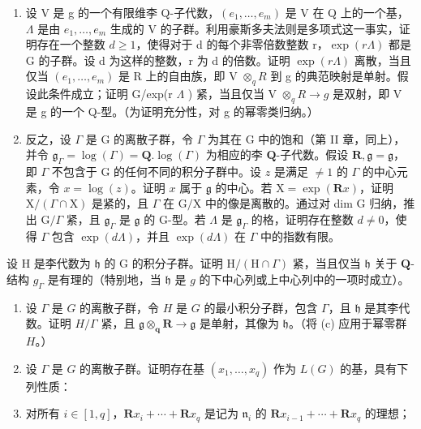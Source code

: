 \begin{enumerate}
\def\labelenumi{(\alph{enumi})}
\setcounter{enumi}{1}
\item
  设 V 是 g 的一个有限维李 Q-子代数，\((e_{1},\ldots,e_{m})\) 是 V 在 Q 上的一个基，\(\Lambda\) 是由 \(e_{1},\ldots,e_{m}\) 生成的 V 的子群。利用豪斯多夫法则是多项式这一事实，证明存在一个整数 \(d\geqslant1\)，使得对于 d 的每个非零倍数整数 r，\(\exp(r\Lambda)\) 都是 G 的子群。设 d 为这样的整数，r 为 d 的倍数。证明 \(\exp(r\Lambda)\) 离散，当且仅当 \((e_{1},\ldots,e_{m})\) 是 R 上的自由族，即 V \(\otimes_{q}R\) 到 g 的典范映射是单射。假设此条件成立；证明 G/exp(r \(\Lambda\) ) 紧，当且仅当 V \(\otimes_{q}R\to g\) 是双射，即 V 是 g 的一个 Q-型。（为证明充分性，对 g 的幂零类归纳。）
\item
  反之，设 \(\Gamma\) 是 G 的离散子群，令 \(\Gamma\) 为其在 G 中的饱和（第 II 章，同上），并令 \(\mathfrak{g}_{\Gamma} = \log (\Gamma) = \mathbf{Q}. \log (\Gamma)\) 为相应的李 \(\mathbf{Q}\)-子代数。假设 \(\mathbf{R}, \mathfrak{g} = \mathfrak{g}\)，即 \(\Gamma\) 不包含于 G 的任何不同的积分子群中。设 \(z\) 是满足 \(\neq 1\) 的 \(\Gamma\) 的中心元素，令 \(x = \log (z)\)。证明 \(x\) 属于 \(\mathfrak{g}\) 的中心。若 \(\mathrm{X} = \exp (\mathbf{R}x)\)，证明 \(\mathrm{X} / (\Gamma \cap \mathrm{X})\) 是紧的，且 \(\Gamma\) 在 \(\mathrm{G} / \mathrm{X}\) 中的像是离散的。通过对 dim G 归纳，推出 \(\mathrm{G} / \Gamma\) 紧，且 \(\mathfrak{g}_{\Gamma}\) 是 \(\mathfrak{g}\) 的 G-型。若 \(\Lambda\) 是 \(\mathfrak{g}_{\Gamma}\) 的格，证明存在整数 \(d \neq 0\)，使得 \(\Gamma\) 包含 \(\exp (d\Lambda)\)，并且 \(\exp (d\Lambda)\) 在 \(\Gamma\) 中的指数有限。
\end{enumerate}

设 H 是李代数为 \(\mathfrak{h}\) 的 G 的积分子群。证明 \(\mathrm{H} / (\mathrm{H} \cap \Gamma)\) 紧，当且仅当 \(\mathfrak{h}\) 关于 \(\mathbf{Q}\)-结构 \(g_{\Gamma}\) 是有理的（特别地，当 \(\mathfrak{h}\) 是 \(g\) 的下中心列或上中心列中的一项时成立）。

\begin{enumerate}
\def\labelenumi{(\alph{enumi})}
\setcounter{enumi}{3}
\item
  设 \(\Gamma\) 是 \(G\) 的离散子群，令 \(H\) 是 \(G\) 的最小积分子群，包含 \(\Gamma\)，且 \(\mathfrak{h}\) 是其李代数。证明 \(H / \Gamma\) 紧，且 \(\mathfrak{g} \otimes_{\mathbf{q}} \mathbf{R} \to \mathfrak{g}\) 是单射，其像为 \(\mathfrak{h}\)。（将 (c) 应用于幂零群 \(H\)。）
\item
  设 \(\Gamma\) 是 \(G\) 的离散子群。证明存在基 \((x_{1},\ldots ,x_{q})\) 作为 \(L(G)\) 的基，具有下列性质：
\item
  对所有 \(i \in [1, q]\)，\(\mathbf{R}x_i + \cdots + \mathbf{R}x_q\) 是记为 \(\mathfrak{n}_i\) 的 \(\mathbf{R}x_{i-1} + \cdots + \mathbf{R}x_q\) 的理想；
\end{enumerate}

